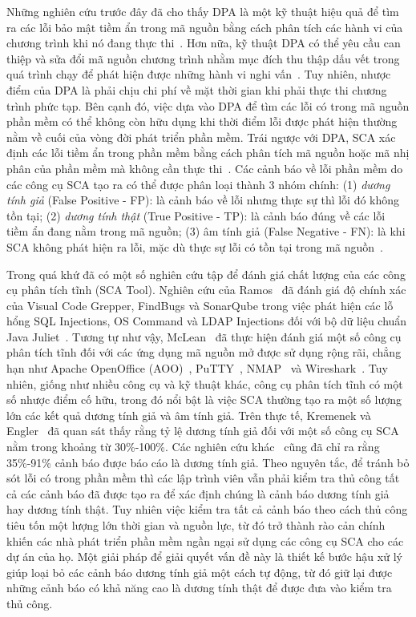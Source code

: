 Những nghiên cứu trước đây đã cho thấy DPA là một kỹ thuật hiệu quả để tìm ra các lỗi bảo mật tiềm ẩn trong mã nguồn bằng cách phân tích các hành vi của chương trình khi nó đang thực thi~\cite{andreasen2017survey}. Hơn nữa, kỹ thuật DPA có thể yêu cầu can thiệp và sửa đổi mã nguồn chương trình nhằm mục đích thu thập dấu vết trong quá trình chạy để phát hiện được những hành vi nghi vấn~\cite{larus1994rewriting}. Tuy nhiên, nhược điểm của DPA là phải chịu chi phí về mặt thời gian khi phải thực thi chương trình phức tạp. Bên cạnh đó, việc dựa vào DPA để tìm các lỗi có trong mã nguồn phần mềm có thể không còn hữu dụng khi thời điểm lỗi được phát hiện thường nằm về cuối của vòng đời phát triển phần mềm. Trái ngược với DPA, SCA xác định các lỗi tiềm ẩn trong phần mềm bằng cách phân tích mã nguồn hoặc mã nhị phân của phần mềm mà không cần thực thi~\cite{zheng2006value}. Các cảnh báo về lỗi phần mềm do các công cụ SCA tạo ra có thể được phân loại thành 3 nhóm chính: (1) \textit{dương tính giả} (False Positive - FP): là cảnh báo về lỗi nhưng thực sự thì lỗi đó không tồn tại; (2) \textit{dương tính thật} (True Positive - TP): là cảnh báo đúng về các lỗi tiềm ẩn đang nằm trong mã nguồn; (3) {âm tính giả} (False Negative - FN): là khi SCA không phát hiện ra lỗi, mặc dù thực sự lỗi có tồn tại trong mã nguồn~\cite{alikhashashneh2018using}.

Trong quá khứ đã có một số nghiên cứu tập để đánh giá chất lượng của các công cụ phân tích tĩnh (SCA Tool). Nghiên cứu của Ramos~\cite{ramos2016evaluating} đã đánh giá độ chính xác của Visual Code Grepper, FindBugs và SonarQube trong việc phát hiện các lỗ hổng SQL Injections, OS Command và LDAP Injections đối với bộ dữ liệu chuẩn Java Juliet~\cite{JULIET}. Tương tự như vậy, McLean~\cite{mclean2012comparing} đã thực hiện đánh giá một số công cụ phân tích tĩnh đối với các ứng dụng mã nguồn mở được sử dụng rộng rãi, chẳng hạn như Apache OpenOffice (AOO)~\cite{steinberg2013apache}, PuTTY~\cite{dooley2006cisco}, NMAP~\cite{lyon2008nmap} và Wireshark~\cite{orebaugh2006wireshark}. Tuy nhiên, giống như nhiều công cụ và kỹ thuật khác, công cụ phân tích tĩnh có một số nhược điểm cố hữu, trong đó nổi bật là việc SCA thường tạo ra một số lượng lớn các kết quả dương tính giả và âm tính giả. Trên thực tế, Kremenek và Engler~\cite{kremenek2003z} đã quan sát thấy rằng tỷ lệ dương tính giả đối với một số công cụ SCA nằm trong khoảng từ 30\%-100\%. Các nghiên cứu khác~\cite{boogerd2006prioritizing,heckman2008establishing} cũng đã chỉ ra rằng 35\%-91\% cảnh báo được báo cáo là dương tính giả. Theo nguyên tắc, để tránh bỏ sót lỗi có trong phần mềm thì các lập trình viên vẫn phải kiểm tra thủ công tất cả các cảnh báo đã được tạo ra để xác định chúng là cảnh báo dương tính giả hay dương tính thật. Tuy nhiên việc kiểm tra tất cả cảnh báo theo cách thủ công tiêu tốn một lượng lớn thời gian và nguồn lực, từ đó trở thành rào cản chính khiến các nhà phát triển phần mềm ngần ngại sử dụng các công cụ SCA cho các dự án của họ. Một giải pháp để giải quyết vấn đề này là thiết kế bước hậu xử lý giúp loại bỏ các cảnh báo dương tính giả một cách tự động, từ đó giữ lại được những cảnh báo có khả năng cao là dương tính thật để được đưa vào kiểm tra thủ công.

